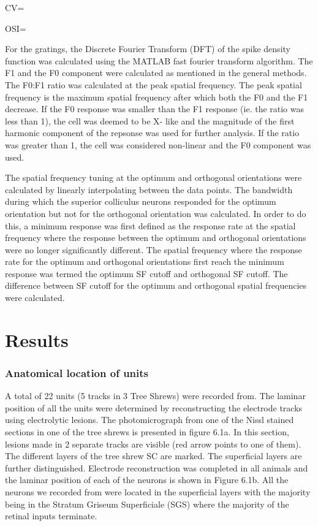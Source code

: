 \documentclass [12pt]{report}
\begin{document}
CV=

OSI=

For the gratings, the Discrete Fourier Transform (DFT) of the spike density function was calculated using the MATLAB fast fourier transform algorithm. The F1 and the F0 component were calculated as mentioned in the general methods. The F0:F1 ratio was calculated at the peak spatial frequency. The peak spatial frequency is the maximum spatial frequency after which both the F0 and the F1 decrease. If the F0 response was smaller than the F1 response (ie. the ratio was less than 1), the cell was deemed to be X- like and the magnitude of the first harmonic component of the repsonse was used for further analysis. If the ratio was greater than 1, the cell was considered non-linear and the F0 component was used.

The spatial frequency tuning at the optimum and orthogonal orientations were calculated by linearly interpolating between the data points. The bandwidth during which the superior colliculus neurons responded for the optimum orientation but not for the orthogonal orientation was calculated. In order to do this,  a minimum response was first defined as the response rate at the spatial frequency where the response between the optimum and orthogonal orientations were no longer significantly different. The spatial frequency where the response rate for the optimum and orthogonal orientations first reach the minimum response was termed the optimum SF cutoff and orthogonal SF cutoff. The difference between SF cutoff for the optimum and orthogonal spatial frequencies were calculated.

	\section{Results}
	\subsubsection{Anatomical location of units}
	
	A total of 22 units (5 tracks in  3 Tree Shrews) were recorded from. The laminar position of all the units were determined by reconstructing the electrode tracks using electrolytic lesions. The photomicrograph from one of the Nissl stained sections in one of the tree shrews is presented in figure 6.1a. In this section, lesions made in 2 separate tracks are visible (red arrow points to one of them). The different layers of the tree shrew SC are marked. The superficial layers are further distinguished. Electrode reconstruction was completed in all animals and the laminar position of each of the neurons is shown in Figure 6.1b. All the neurons we recorded from were located in the superficial layers with the majority being in the Stratum Griseum Superficiale (SGS) where the majority of the retinal inputs terminate.
	
\end{document}
